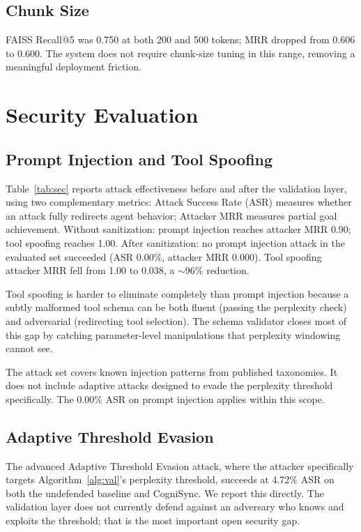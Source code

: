 \documentclass[sigconf]{acmart}
\begin{document}
\subsection{Chunk Size}

FAISS Recall@5 was 0.750 at both 200 and 500 tokens; MRR dropped from
0.606 to 0.600. The system does not require chunk-size tuning in this
range, removing a meaningful deployment friction.

\section{Security Evaluation}
\label{sec:security}

\subsection{Prompt Injection and Tool Spoofing}

Table~\ref{tab:sec} reports attack effectiveness before and after the
validation layer, using two complementary metrics: Attack Success Rate
(ASR) measures whether an attack fully redirects agent behavior; Attacker
MRR measures partial goal achievement. Without sanitization: prompt
injection reaches attacker MRR 0.90; tool spoofing reaches 1.00. After
sanitization: no prompt injection attack in the evaluated set succeeded
(ASR 0.00\%, attacker MRR 0.000). Tool spoofing attacker MRR fell from
1.00 to 0.038, a $\sim$96\% reduction.

Tool spoofing is harder to eliminate completely than prompt injection
because a subtly malformed tool schema can be both fluent (passing the
perplexity check) and adversarial (redirecting tool selection). The schema
validator closes most of this gap by catching parameter-level manipulations
that perplexity windowing cannot see.

The attack set covers known injection patterns from published
taxonomies. It does not
include adaptive attacks designed to evade the perplexity threshold
specifically. The 0.00\% ASR on prompt injection applies within this scope.

\subsection{Adaptive Threshold Evasion}
\label{sec:adaptive}

The advanced Adaptive Threshold Evasion attack, where the attacker
specifically targets Algorithm~\ref{alg:val}'s perplexity threshold,
succeeds at 4.72\% ASR on both the undefended baseline and CogniSync.
We report this directly. The validation layer does not currently defend
against an adversary who knows and exploits the threshold; that is the
most important open security gap.
\end{document}
